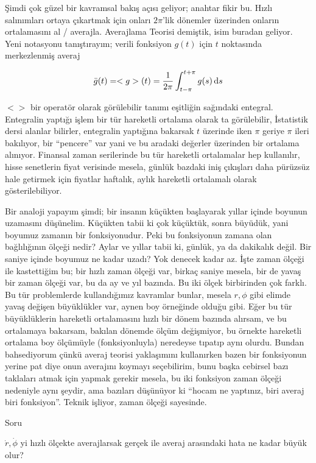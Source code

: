\documentclass[12pt,fleqn]{article}\usepackage{../../common}
\begin{document}
Şimdi çok güzel bir kavramsal bakış açısı geliyor; anahtar fikir bu. Hızlı
salınımları ortaya çıkartmak için onları $2\pi$'lik dönemler üzerinden onların
ortalamasını al / averajla. Averajlama Teorisi demiştik, isim buradan
geliyor. Yeni notasyonu tanıştırayım; verili fonksiyon $g(t)$ için $t$
noktasında merkezlenmiş averaj

$$ \bar{g}(t) = <g>(t) = \frac{1}{2\pi} \int _{t-\pi}^{t+\pi} g(s) \,\mathrm{d} s$$

$<>$ bir operatör olarak görülebilir tanımı eşitliğin sağındaki
entegral. Entegralin yaptığı işlem bir tür hareketli ortalama olarak ta
görülebilir, İstatistik dersi alanlar bilirler, entegralin yaptığına bakarsak
$t$ üzerinde iken $\pi$ geriye $\pi$ ileri bakılıyor, bir ``pencere'' var yani
ve bu aradaki değerler üzerinden bir ortalama alınıyor. Finansal zaman
serilerinde bu tür hareketli ortalamalar hep kullanılır, hisse senetlerin fiyat
verisinde mesela, günlük bazdaki iniş çıkışları daha pürüzsüz hale getirmek için
fiyatlar haftalık, aylık hareketli ortalamalı olarak gösterilebiliyor.

Bir analoji yapayım şimdi; bir insanın küçükten başlayarak yıllar içinde boyunun
uzamasını düşünelim. Küçükten tabii ki çok küçüktük, sonra büyüdük, yani
boyumuz zamanın bir fonksiyonudur. Peki bu fonksiyonun zamana olan bağlılığının
ölçeği nedir? Aylar ve yıllar tabii ki, günlük, ya da dakikalık değil. Bir
saniye içinde boyumuz ne kadar uzadı? Yok denecek kadar az. İşte zaman ölçeği
ile kastettiğim bu; bir hızlı zaman ölçeği var, birkaç saniye mesela, bir de
yavaş bir zaman ölçeği var, bu da ay ve yıl bazında. Bu iki ölçek birbirinden
çok farklı. Bu tür problemlerde kullandığımız kavramlar bunlar, mesela $r,\phi$
gibi elimde yavaş değişen büyüklükler var, aynen boy örneğinde olduğu gibi. Eğer
bu tür büyüklüklerin hareketli ortalamasını hızlı bir dönem bazında alırsam, ve
bu ortalamaya bakarsam, bakılan dönemde ölçüm değişmiyor, bu örnekte hareketli
ortalama boy ölçümüyle (fonksiyonluyla) neredeyse tıpatıp aynı olurdu. Bundan
bahsediyorum çünkü averaj teorisi yaklaşımını kullanırken bazen bir fonksiyonun
yerine pat diye onun averajını koymayı seçebilirim, bunu başka cebirsel bazı
taklaları atmak için yapmak gerekir mesela, bu iki fonksiyon zaman ölçeği
nedeniyle aynı şeydir, ama bazıları düşünüyor ki ``hocam ne yaptınız, biri
averaj biri fonksiyon''. Teknik işliyor, zaman ölçeği sayesinde. 

Soru

$\dot{r},\dot{\phi}$ yi hızlı ölçekte averajlarsak gerçek ile averaj arasındaki
hata ne kadar büyük olur? 
\end{document}
